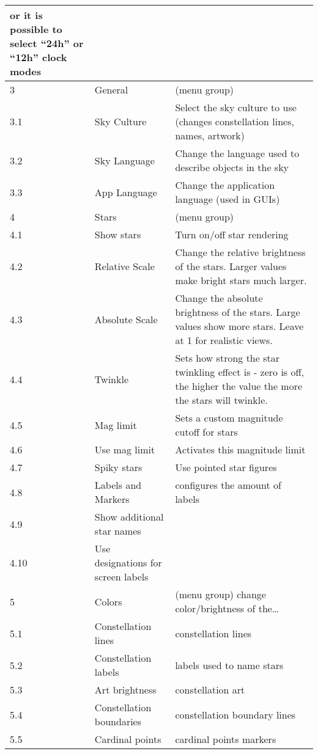 \begin{longtable}{l|p{45mm}|p{85mm}}
                            or it is possible to select ``24h'' or ``12h'' clock modes\\\midrule
3    & General      & (menu group)\\%
3.1  & Sky Culture  & Select the sky culture to use (changes constellation lines, names, artwork)\\%
3.2  & Sky Language & Change the language used to describe objects in the sky\\%
3.3  & App Language & Change the application language (used in GUIs) \\\midrule
4    & Stars          & (menu group)\\%
4.1  & Show stars     & Turn on/off star rendering\\%
4.2  & Relative Scale & Change the relative brightness of the stars. Larger values make bright stars much larger.\\%
4.3  & Absolute Scale & Change the absolute brightness of the stars. Large values show more stars. Leave at 1 for realistic views. \\%
4.4  & Twinkle        & Sets how strong the star twinkling effect is - zero is off, the higher the value the more the stars will twinkle.\\%
4.5  & Mag limit      & Sets a custom magnitude cutoff for stars\\
4.6  & Use mag limit  & Activates this magnitude limit \\
4.7  & Spiky stars    & Use pointed star figures \\
4.8  & Labels and Markers & configures the amount of labels \\
4.9  & Show additional star names  & \\
4.10 & Use designations for screen labels & \\\midrule
5    & Colors                      & (menu group) change color/brightness of the\ldots\\%
5.1  & Constellation lines         & constellation lines\\%
5.2  & Constellation labels        & labels used to name stars\\%
5.3  & Art brightness              & constellation art\\%
5.4  & Constellation boundaries    & constellation boundary lines\\%
5.5  & Cardinal points             & cardinal points markers\\%

\end{longtable}
